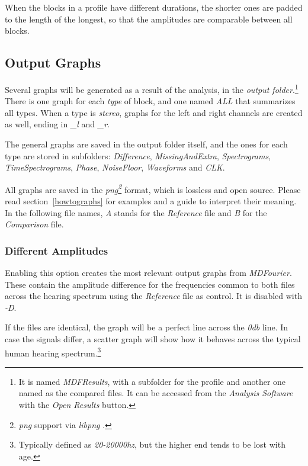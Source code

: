 \documentclass[10pt,a4paper]{report}
\newcommand{\defineCite}[2]{\textit{\acrshort{#1}\footnote{\textit{\acrlong{#1}} #2.}}}
\newcommand{\hz}[1]{\textit{\mbox{#1\acrshort{hz}}}}
\newcommand{\db}[1]{\textit{\mbox{#1\acrshort{db}}}}
\begin{document}
\begin{appendices}
When the blocks in a profile have different durations, the shorter ones are padded to the length of the longest, so that the amplitudes are comparable between all blocks.

\subsection{Output Graphs}
\label{outputfiles}

Several graphs will be generated as a result of the analysis, in the \textit{output folder}.\footnote{It is named \textit{MDFResults}, with a subfolder for the profile and another one named as the compared files. It can be accessed from the \textit{Analysis Software} with the \textit{Open Results} button.} There is one graph for each \textit{type} of block, and one named \textit{ALL} that summarizes all types. When a type is \textit{stereo}, graphs for the left and right channels are created as well, ending in \textit{\_l} and \textit{\_r}.

The general graphs are saved in the output folder itself, and the ones for each type are stored in subfolders: \textit{Difference}, \textit{MissingAndExtra}, \textit{Spectrograms}, \textit{TimeSpectrograms}, \textit{Phase}, \textit{NoiseFloor}, \textit{Waveforms} and \textit{CLK}.

All graphs are saved in the \defineCite{png}{support via \textit{libpng} \cite{libpng}} format, which is lossless and open source. Please read section~\ref{howtographs} for examples and a guide to interpret their meaning. In the following file names, \textit{A} stands for the \textit{Reference} file and \textit{B} for the \textit{Comparison} file.

\subsubsection{Different Amplitudes}

Enabling this option creates the most relevant output graphs from \textit{MDFourier}. These contain the amplitude difference for the frequencies common to both files across the hearing spectrum using the \textit{Reference} file as control. It is disabled with \textit{-D}.

If the files are identical, the graph will be a perfect line across the \db{0} line. In case the signals differ, a scatter graph will show how it behaves across the typical human hearing spectrum.\footnote{Typically defined as \hz{20-20000}, but the higher end tends to be lost with age.}


\end{appendices}
\end{document}
